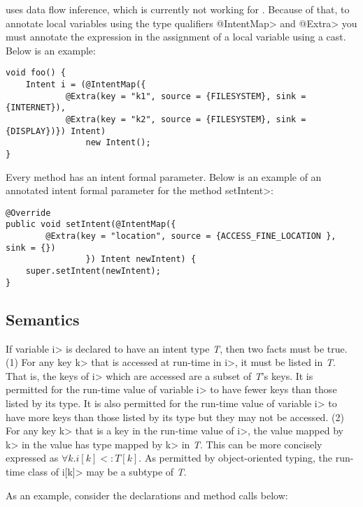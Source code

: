 \TheFlowChecker{} uses data flow inference, which is currently not working for
\theIntentChecker{}. Because of that, to annotate local variables using the type
qualifiers \<@IntentMap> and \<@Extra> you must annotate the expression in the
assignment of a local variable using a cast. Below is an example:

\begin{Verbatim}
void foo() {
    Intent i = (@IntentMap({
            @Extra(key = "k1", source = {FILESYSTEM}, sink = {INTERNET}),
            @Extra(key = "k2", source = {FILESYSTEM}, sink = {DISPLAY})}) Intent)
                new Intent();
}
\end{Verbatim}

Every \onReceive{} method has an intent formal parameter.
Below is an example of an annotated intent formal parameter for the \onReceive{}
method \<setIntent>:

\begin{Verbatim}
@Override
public void setIntent(@IntentMap({
        @Extra(key = "location", source = {ACCESS_FINE_LOCATION }, sink = {})
                }) Intent newIntent) {
    super.setIntent(newIntent);
}
\end{Verbatim}

\subsection{Semantics}
If variable \<i> is declared to have an intent type \textit{T}, then two facts must be
true. (1) For any key \<k> that is accessed at run-time in \<i>, it must be
listed in \textit{T}. That is, the keys of \<i> which are accessed are
a subset of \textit{T}'s keys. It is
permitted for the run-time value of variable \<i> to have fewer keys than those
listed by its type. It is also permitted for the run-time value of variable
\<i> to have more keys than those listed by its type but they may not be
accessed. (2) For any key \<k> that is a key in the run-time value of \<i>,
the value mapped by \<k> in the value has type mapped by \<k> in \textit{T}. 
This can be more concisely expressed as $\forall k.i[k] <: T[k]$. As permitted
by object-oriented typing, the run-time class of \<i[k]> may be a subtype of \textit{T}.

As an example, consider the declarations and method calls below:

